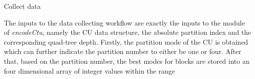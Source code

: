 \begin{algorithm}[!b]
{{{    
    \eIf{\iPartNum $\equiv 1$}{
    Create a new csv file, append the value of \uiDepth at the end of the name of the new csv file\;
    \For{$y\leftarrow 0$ \KwTo \uiCuSize}{
    \For{$x\leftarrow 0$ \KwTo \uiCuSize}{
    Write $pOrgPel[x]$ into $row_m$ in csv file\;
    }
    \pOrgPel $\leftarrow$ \pOrgPel + \iStride\;
    }
    Write $iDir[0]$ into the end of $row_m$ in the csv file\;
    }{
    Create a new csv file, append the value of (\uiDepth + $1$) at the end of the name of the new csv file\;
    \sizeOfSubBlk$\leftarrow$\getSizeOfSubBlk{\pcCU, \uiDepth}\;
    \For{$j\leftarrow 0$ \KwTo \iPartNum}{
    \uIf{$j\equiv0$}{
    \yStartPos $\leftarrow 0$
    \& \xStartPos $\leftarrow 0$
    \& \yEndPos $\leftarrow$ \sizeOfSubBlk\
    \& \xEndPos $\leftarrow$ \sizeOfSubBlk\;
    }
    \uElseIf{$j\equiv1$}{
    \yStartPos $\leftarrow 0$
    \& \xStartPos $\leftarrow$ \sizeOfSubBlk
    \& \yEndPos $\leftarrow$ \sizeOfSubBlk
    \& \xEndPos $\leftarrow \sizeOfSubBlk \times 2$\;
    }
    \uElseIf{$j\equiv2$}{
    \yStartPos $\leftarrow$ \sizeOfSubBlk
    \& \xStartPos $\leftarrow 0$
    \& \yEndPos $\leftarrow \sizeOfSubBlk \times 2$
    \& \xEndPos $\leftarrow$ \sizeOfSubBlk\;
    }
    \uElseIf{$j\equiv3$}{
    \yStartPos $\leftarrow$ \sizeOfSubBlk
    \& \xStartPos $\leftarrow$ \sizeOfSubBlk
    \& \yEndPos $\leftarrow \sizeOfSubBlk \times 2$
    \& \xEndPos $\leftarrow \sizeOfSubBlk \times 2$\;
    }
    }
    \For{$y\leftarrow$ \yStartPos \KwTo \yEndPos}{
    \For{$x\leftarrow$ \xStartPos \KwTo \xEndPos}{
    Write $pOrgPel[x]$ into $row_m$ in the csv file\;
    }
    \pOrgPel $\leftarrow$ \pOrgPel+ \iStride\;
    }
    Write $iDir[j]$ into the end of $row_m$ in the csv file\;
    }}}}
 \caption{Collect data}\label{algo:collect-data}
\end{algorithm}
The inputs to the data collecting workflow are exactly the inputs to
the module of \emph{encodeCtu}, namely the CU data structure,
the absolute partition index and the corresponding quad-tree depth.
Firstly, the partition mode of the CU is obtained which can further indicate
the partition number to either be one or four.
After that, based on the partition number, the best modes for blocks
are stored into an four dimensional array of integer values within the range
